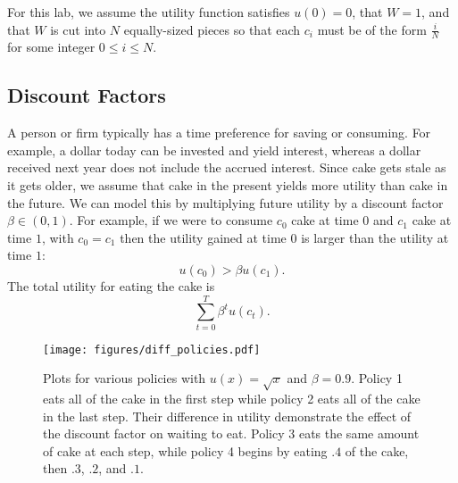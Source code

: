 For this lab, we assume the utility function satisfies $u(0) = 0$, that $W = 1$, and that $W$ is cut into $N$ equally-sized pieces so that each $c_i$ must be of the form $\frac{i}{N}$ for some integer $0\leq i \leq N$.

\subsection*{Discount Factors} %

A person or firm typically has a time preference for saving or consuming.
For example, a dollar today can be invested and yield interest, whereas a dollar received next year does not include the accrued interest.
Since cake gets stale as it gets older, we assume that cake in the present yields more utility than cake in the future.
We can model this by multiplying future utility by a discount factor $\beta \in (0,1)$.
For example, if we were to consume $c_0$ cake at time $0$ and $c_1$ cake at time $1$, with $c_0 = c_1$ then the utility gained at time $0$ is larger than the utility at time $1$:
\[
u(c_0) > \beta u(c_1).
\]
The total utility for eating the cake is
\[
\sum_{t=0}^T \beta^t u(c_t).
\]

\begin{figure}[H]
\texttt{[image: figures/diff\_policies.pdf]}
\caption{Plots for various policies with $u(x) = \sqrt{x}$ and $\beta = 0.9$.
Policy 1 eats all of the cake in the first step while policy 2 eats all of the cake in the last step.
Their difference in utility demonstrate the effect of the discount factor on waiting to eat.
Policy 3 eats the same amount of cake at each step, while policy 4 begins by eating $.4$ of the cake, then $.3$, $.2$, and $.1$.}
\label{fig:diff_pols}
\end{figure}



%
%



